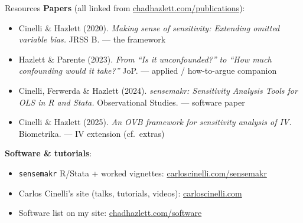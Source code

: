 \documentclass[xcolor=dvipsnames]{beamer}
\begin{document}


\begin{frame}{Resources}
\small
\textbf{Papers} (all linked from \href{https://chadhazlett.com/publications.html}{chadhazlett.com/publications}):
\begin{itemize}
\item Cinelli \& Hazlett (2020). \textit{Making sense of sensitivity: Extending omitted variable bias.} JRSS B. --- the framework
\item Hazlett \& Parente (2023). \textit{From ``Is it unconfounded?'' to ``How much confounding would it take?''} JoP. --- applied / how-to-argue companion
\item Cinelli, Ferwerda \& Hazlett (2024). \textit{sensemakr: Sensitivity Analysis Tools for OLS in R and Stata.} Observational Studies. --- software paper
\item Cinelli \& Hazlett (2025). \textit{An OVB framework for sensitivity analysis of IV.} Biometrika. --- IV extension (cf.\ extras)
\end{itemize}
\medskip
\textbf{Software \& tutorials}:
\begin{itemize}
\item \texttt{sensemakr} R/Stata + worked vignettes: \href{http://carloscinelli.com/sensemakr/}{carloscinelli.com/sensemakr}
\item Carlos Cinelli's site (talks, tutorials, videos): \href{http://carloscinelli.com}{carloscinelli.com}
\item Software list on my site: \href{https://chadhazlett.com/software.html}{chadhazlett.com/software}
\end{itemize}
\end{frame}
\end{document}
